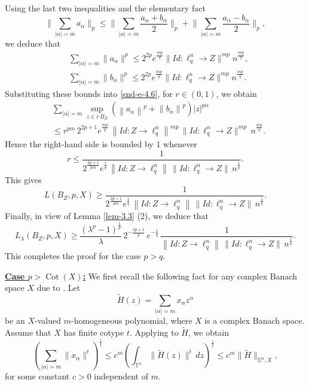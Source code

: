 \documentclass[a4paper,11pt, reqno]{amsart}
\theoremstyle{definition}
\newcommand{\norm}[1]{\left\lVert#1\right\rVert}
\begin{document}
Using the last two inequalities and the elementary fact
\[
\Big\|\sum_{|\alpha|=m}a_\alpha\Big\|_p\le \Big\|\sum_{|\alpha|=m} \frac{a_\alpha+b_\alpha}{2}\Big\|_p+\Big\|\sum_{|\alpha|=m}\frac{a_\alpha-b_\alpha}{2}\Big\|_p,
\]
we deduce that
\begin{align*}
&\sum_{|\alpha|=m}\|a_\alpha\|^p
\le 2^{2p} e^{\frac{mp}{q}}\|Id:\ell_q^n\to Z\|^{mp} n^{\frac{mp}{q}},\\
& \sum_{|\alpha|=m}\|b_\alpha\|^p
\le 2^{2p} e^{\frac{mp}{q}}\|Id:\ell_q^n\to Z\|^{mp} n^{\frac{mp}{q}}.
\end{align*}
Substituting these bounds into \eqref{snd-e-4.6}, for $r \in (0,1)$, we obtain
\begin{align*}
& \sum_{|\alpha|=m} \sup_{z \in r \, B_{Z}} (\norm{a_{\alpha}}^p+\norm{b_{\alpha}}^p)|z|^{p\alpha}\\
& \leq r^{pm}\,2^{2p+1} e^{\frac{mp}{q}}\, \norm{Id: Z \rightarrow \ell^n_q}^{mp}\, \|Id:\ell_q^n\to Z\|^{mp}\, n^{\frac{mp}{q}}. 
\end{align*} 
Hence the right-hand side is bounded by $1$ whenever
\[
r\le \frac{1}{2^{\frac{2p+1}{pm}}e^{\frac{1}{q}}\, \norm{Id: Z \rightarrow \ell^n_q}\,\|Id:\ell_q^n\to Z\|\, n^{\frac{1}{q}}}.
\]
This gives 
\[
L(B_{Z}, p,X)\geq \frac{1}{2^{\frac{2p+1}{pm}}e^{\frac{1}{q}}\, \norm{Id: Z \rightarrow \ell^n_q}\,\|Id:\ell_q^n\to Z\|\, n^{\frac{1}{q}}}.
\]
Finally, in view of Lemma \ref{lem-3.3} (2), we deduce that
\begin{equation} \label{e-4.55}
		L_{\lambda}(B_{Z}, p,X) \geq \dfrac{\left(\lambda^p -1\right)^{\frac{1}{p}}}{\lambda}\, 2^{-\frac{2p+1}{p}}\, e^{-\frac{1}{q}}\,  \frac{1}{ \norm{Id: Z \rightarrow \ell^n_q}\,\|Id:\ell_q^n\to Z\|\, n^{\frac{1}{q}}}.
\end{equation}
This completes the proof for the case $p>q$.

\medskip
\noindent
\underline{\textbf{Case $p > \operatorname{Cot}(X)$:}} We first recall the following fact for any complex Banach space $X$ due to \cite{carando-2020}.
Let 
\[
\widetilde{H}(z)=\sum_{|\alpha|=m} x_{\alpha} z^\alpha
\]
be an $X$-valued $m$-homogeneous polynomial, where $X$ is a complex Banach space. 
Assume that $X$ has finite cotype $t$. Applying \cite[Theorem 3.1]{carando-2020} to $\widetilde{H}$, we obtain
\begin{equation} \label{e-1.35}
	\left(\sum_{|\alpha|=m} \|x_{\alpha}\|^t\right)^{\frac{1}{t}}
	\leq c^m \left(\int_{\mathbb{T}^n} \|\widetilde{H}(z)\|^t \, dz\right)^{\frac{1}{t}}
	\leq c^m \|\widetilde H\|_{\mathbb{D}^n,X},
\end{equation}
for some constant $c>0$ independent of $m$.
\end{document}
